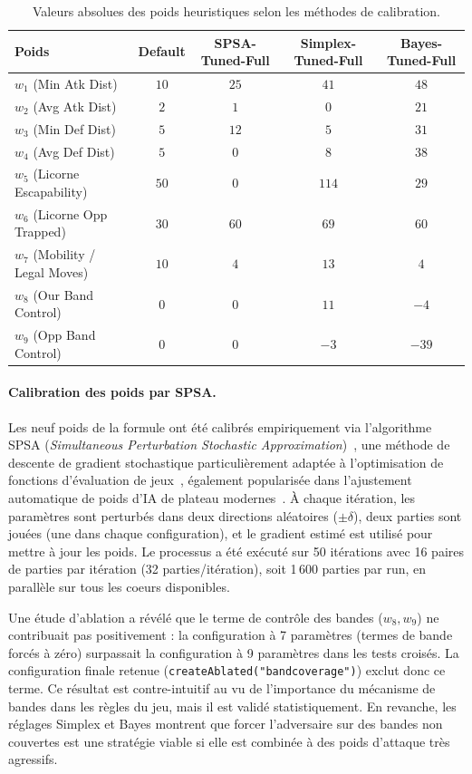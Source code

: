 \documentclass[12pt,a4paper]{article}
\begin{document}
\begin{table}[H]
\centering
\begin{tabular}{l c c c c}
\toprule
Poids & Default & SPSA-Tuned-Full & Simplex-Tuned-Full & Bayes-Tuned-Full \\
\midrule
$w_1$ (Min Atk Dist) & $10$ & $25$ & $41$ & $48$ \\
$w_2$ (Avg Atk Dist) & $2$ & $1$ & $0$ & $21$ \\
$w_3$ (Min Def Dist) & $5$ & $12$ & $5$ & $31$ \\
$w_4$ (Avg Def Dist) & $5$ & $0$ & $8$ & $38$ \\
$w_5$ (Licorne Escapability) & $50$ & $0$ & $114$ & $29$ \\
$w_6$ (Licorne Opp Trapped) & $30$ & $60$ & $69$ & $60$ \\
$w_7$ (Mobility / Legal Moves) & $10$ & $4$ & $13$ & $4$ \\
$w_8$ (Our Band Control) & $0$ & $0$ & $11$ & $-4$ \\
$w_9$ (Opp Band Control) & $0$ & $0$ & $-3$ & $-39$ \\
\bottomrule
\end{tabular}
\caption{Valeurs absolues des poids heuristiques selon les méthodes de calibration.}
\label{tab-heuristic-weights}
\end{table}


\paragraph{Calibration des poids par SPSA.}
Les neuf poids de la formule ont été calibrés empiriquement via l'algorithme SPSA (\textit{Simultaneous Perturbation Stochastic Approximation})~\cite{spall1998}, une méthode de descente de gradient stochastique particulièrement adaptée à l'optimisation de fonctions d'évaluation de jeux~\cite{cp_testing}, également popularisée dans l'ajustement automatique de poids d'IA de plateau modernes~\cite{monroe_chess_ai}. À chaque itération, les paramètres sont perturbés dans deux directions aléatoires ($\pm \delta$), deux parties sont jouées (une dans chaque configuration), et le gradient estimé est utilisé pour mettre à jour les poids. Le processus a été exécuté sur 50 itérations avec 16 paires de parties par itération (32 parties/itération), soit 1\,600 parties par run, en parallèle sur tous les coeurs disponibles.

Une étude d'ablation a révélé que le terme de contrôle des bandes ($w_8, w_9$) ne contribuait pas positivement : la configuration à 7 paramètres (termes de bande forcés à zéro) surpassait la configuration à 9 paramètres dans les tests croisés. La configuration finale retenue (\texttt{createAblated("bandcoverage")}) exclut donc ce terme. Ce résultat est contre-intuitif au vu de l'importance du mécanisme de bandes dans les règles du jeu, mais il est validé statistiquement. En revanche, les réglages Simplex et Bayes montrent que forcer l'adversaire sur des bandes non couvertes est une stratégie viable si elle est combinée à des poids d'attaque très agressifs.
\end{document}

